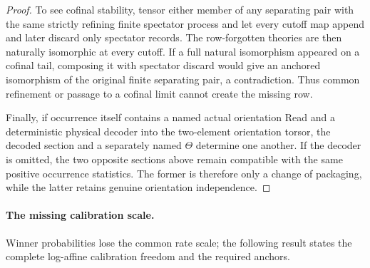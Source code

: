 \documentclass[11pt]{article}
\numberwithin{equation}{section}
\theoremstyle{definition}
\theoremstyle{remark}
\begin{document}
\begin{proof}
To see cofinal stability, tensor either member of any separating pair with the
same strictly refining finite spectator process and let every cutoff map append
and later discard only spectator records.  The row-forgotten theories are then
naturally isomorphic at every cutoff.  If a full natural isomorphism appeared
on a cofinal tail, composing it with spectator discard would give an anchored
isomorphism of the original finite separating pair, a contradiction.  Thus
common refinement or passage to a cofinal limit cannot create the missing row.

Finally, if occurrence itself contains a named actual orientation Read and a
deterministic physical decoder into the two-element orientation torsor, the
decoded section and a separately named $\Theta$ determine one another.  If the
decoder is omitted, the two opposite sections above remain compatible with the
same positive occurrence statistics.  The former is therefore only a change
of packaging, while the latter retains genuine orientation independence.
\end{proof}

\paragraph{The missing calibration scale.}
\label{rem:main-calibration-fibre}
Winner probabilities lose the common rate scale; the following result
states the complete log-affine calibration freedom and the required anchors.
\end{document}
